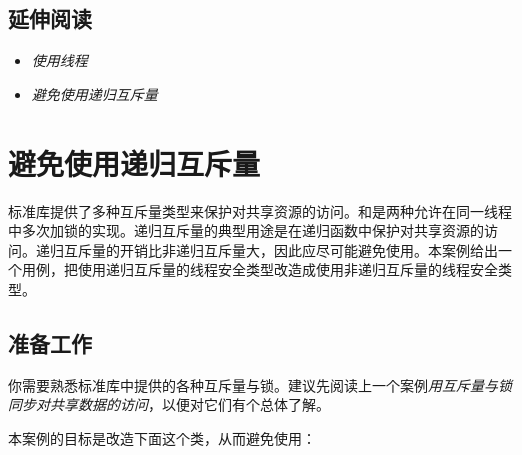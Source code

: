 
\subsection{延伸阅读}



\begin{itemize}
\item \textit{使用线程}



\item \textit{避免使用递归互斥量}

\end{itemize}



\section{避免使用递归互斥量}



标准库提供了多种互斥量类型来保护对共享资源的访问。和是两种允许在同一线程中多次加锁的实现。递归互斥量的典型用途是在递归函数中保护对共享资源的访问。递归互斥量的开销比非递归互斥量大，因此应尽可能避免使用。本案例给出一个用例，把使用递归互斥量的线程安全类型改造成使用非递归互斥量的线程安全类型。



\subsection{准备工作}



你需要熟悉标准库中提供的各种互斥量与锁。建议先阅读上一个案例\textit{用互斥量与锁同步对共享数据的访问}，以便对它们有个总体了解。



本案例的目标是改造下面这个类，从而避免使用：



